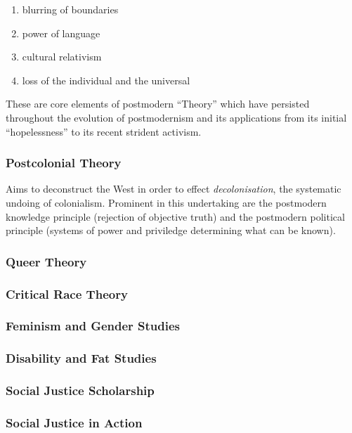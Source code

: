 \documentclass[10pt,titlepage]{book}
\begin{document}
\begin{enumerate}
\item blurring of boundaries
\item power of language
\item cultural relativism
\item loss of the individual and the universal
\end{enumerate}

These are core elements of postmodern ``Theory'' which have persisted throughout the evolution of postmodernism and its applications from its initial ``hopelessness'' to its recent strident activism.

\subsubsection{Postcolonial Theory}

Aims to deconstruct the West in order to effect \emph{decolonisation}, the systematic undoing of colonialism.
Prominent in this undertaking are the postmodern knowledge principle (rejection of objective truth) and the postmodern political principle (systems of power and priviledge determining what can be known).

\subsubsection{Queer Theory}

\subsubsection{Critical Race Theory}

\subsubsection{Feminism and Gender Studies}

\subsubsection{Disability and Fat Studies}

\subsubsection{Social Justice Scholarship}

\subsubsection{Social Justice in Action}
\end{document}
